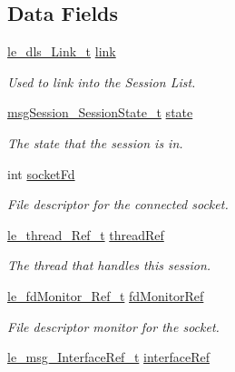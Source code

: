 \subsection*{Data Fields}
\begin{DoxyCompactItemize}
\item 
\hyperlink{structle__dls___link__t}{le\+\_\+dls\+\_\+\+Link\+\_\+t} \hyperlink{structmsg_session___session__t_a99117e0b3a414be62f8d055968cf1596}{link}
\begin{DoxyCompactList}\small\item\em Used to link into the Session List. \end{DoxyCompactList}\item 
\hyperlink{messaging_session_8h_a0f289e6988e2663a4fc8cecb9aba018c}{msg\+Session\+\_\+\+Session\+State\+\_\+t} \hyperlink{structmsg_session___session__t_a81a94edbffe13c6b9663f7a8934cb8a5}{state}
\begin{DoxyCompactList}\small\item\em The state that the session is in. \end{DoxyCompactList}\item 
int \hyperlink{structmsg_session___session__t_a01565048dd3633872a737def3ea02889}{socket\+Fd}
\begin{DoxyCompactList}\small\item\em File descriptor for the connected socket. \end{DoxyCompactList}\item 
\hyperlink{le__thread_8h_a32121104c6b4ca39008eb79a4d6862f2}{le\+\_\+thread\+\_\+\+Ref\+\_\+t} \hyperlink{structmsg_session___session__t_a5502ceb40c46c4fbfbe0f5f292073785}{thread\+Ref}
\begin{DoxyCompactList}\small\item\em The thread that handles this session. \end{DoxyCompactList}\item 
\hyperlink{le__fd_monitor_8h_a85048556f0b95147af81e76907895d42}{le\+\_\+fd\+Monitor\+\_\+\+Ref\+\_\+t} \hyperlink{structmsg_session___session__t_a2a001d5672ed3d496f3145fc9011c8be}{fd\+Monitor\+Ref}
\begin{DoxyCompactList}\small\item\em File descriptor monitor for the socket. \end{DoxyCompactList}\item 
\hyperlink{le__messaging_8h_a67826f96880f776bda0a3b9117304b45}{le\+\_\+msg\+\_\+\+Interface\+Ref\+\_\+t} \hyperlink{structmsg_session___session__t_ab23ef39cc5413a9de78010bc0c927579}{interface\+Ref}

\end{DoxyCompactItemize}
